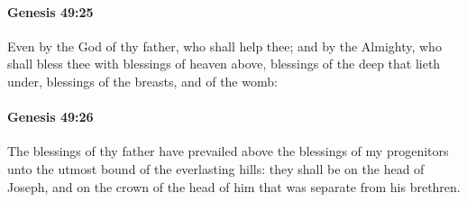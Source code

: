 		\paragraph{Genesis 49:25} %
			\label{GENESIS-49-25}

			Even by the God of thy father, who shall help thee; and by the Almighty, who shall bless thee with blessings of heaven above, blessings of the deep that lieth under, blessings of the breasts, and of the womb:


		\paragraph{Genesis 49:26} %
			\label{GENESIS-49-26}

			The blessings of thy father have prevailed above the blessings of my progenitors unto the utmost bound of the everlasting hills: they shall be on the head of Joseph, and on the crown of the head of him that was separate from his brethren.

